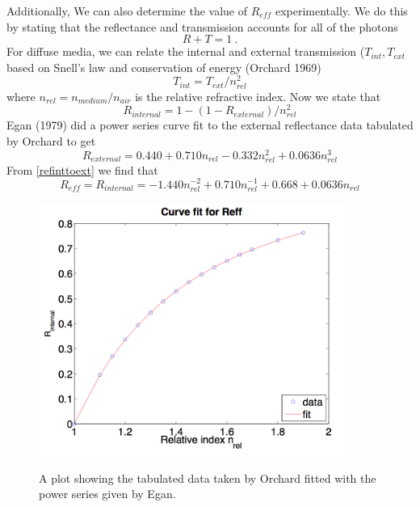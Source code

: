 \vspace{3mm}
Additionally, We can also determine the value of $R_{eff}$ experimentally. We do this by stating that the reflectance and transmission accounts for all of the photons
\begin{equation}
  R + T = 1 \ .
\end{equation}
For diffuse media, we can relate the internal and external transmission ($T_{int}, T_{ext}$ based on Snell's law and conservation of energy (Orchard 1969)
\begin{equation}
  T_{int} = T_{ext} /n_{rel}^2
\end{equation}
where $n_{rel} = n_{medium}/n_{air}$ is the relative refractive index. Now we state that
\begin{equation}
\label{refinttoext}
R_{internal} = 1 - (1 - R_{external})/n_{rel}^2
\end{equation}
Egan (1979) \cite{Egan1979} did a power series curve fit to the external reflectance data tabulated by Orchard \cite{Orchard1969} to get
\begin{equation}
R_{external} = 0.440 + 0.710n_{rel} -0.332n_{rel}^2 + 0.0636n_{rel}^3
\end{equation}
From \ref{refinttoext} we find that \cite{Sevick2002}
\begin{equation}
\label{exp eff}
R_{eff} = R_{internal} = -1.440n_{rel}^{-2} + 0.710n_{rel}^{-1} + 0.668 + 0.0636n_{rel}
\end{equation}
\begin{figure}[h]
\centering
\includegraphics[width=10cm]{./figures/2_Theory/ReflectanceCurveFit.png}
\label{ReflectanceCurveFit}
\caption{A plot showing the tabulated data taken by Orchard fitted with the power series given by Egan.} 
\end{figure}